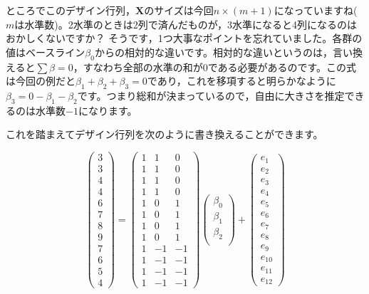 \documentclass{ltjsbook}
\begin{document}
ところでこのデザイン行列，$\bm{X}$のサイズは今回$n \times (m+1)$になっていますね($m$は水準数)。2水準のときは2列で済んだものが，3水準になると4列になるのはおかしくないですか？ 
そうです，1つ大事なポイントを忘れていました。各群の値はベースライン$\beta_0$からの相対的な違いです。相対的な違いというのは，言い換えると$\sum \beta =0$，すなわち全部の水準の和が$0$である必要があるのです。この式は今回の例だと$\beta_1+\beta_2+\beta_3=0$であり，これを移項すると明らかなように$\beta_3 = 0 - \beta_1 - \beta_2$です。つまり総和が決まっているので，自由に大きさを推定できるのは水準数$-1$になります。

これを踏まえてデザイン行列を次のように書き換えることができます。

\[
	\begin{pmatrix}
		3\\
		3\\
		4\\
		4\\
		6\\
		7\\
		8\\
		9\\
		7\\
		6\\
		5\\
		4
		\end{pmatrix}
		= 
		\begin{pmatrix}
		1 & 1 & 0\\
		1 & 1 & 0\\
		1 & 1 & 0\\
		1 & 1 & 0\\
		1 & 0 & 1\\
		1 & 0 & 1\\
		1 & 0 & 1\\
		1 & 0 & 1\\
		1 & -1 & -1\\
		1 & -1 & -1\\
		1 & -1 & -1\\
		1 & -1 & -1
		\end{pmatrix}
		\begin{pmatrix}
		\beta_0\\
		\beta_1\\
		\beta_2\\
		\end{pmatrix}+
		\begin{pmatrix}
		e_1\\
		e_2\\
		e_3\\
		e_4\\
		e_5\\
		e_6\\
		e_7\\
		e_8\\
		e_9\\
		e_{10}\\
		e_{11}\\
		e_{12}
		
		\end{pmatrix}
\]
\end{document}
